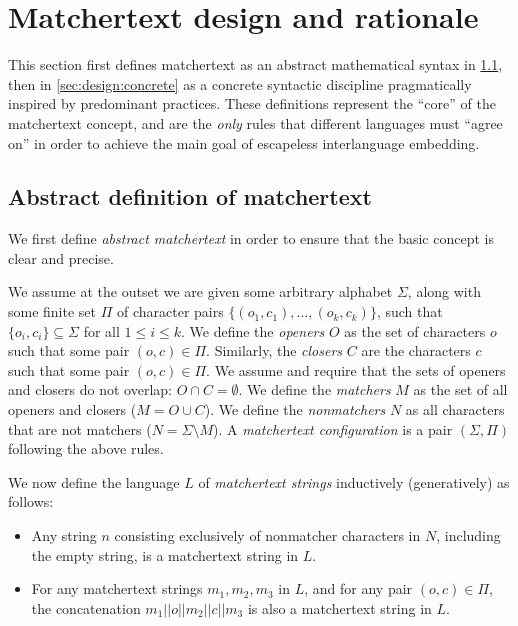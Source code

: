 \section{Matchertext design and rationale}
\label{sec:design}

This section first defines matchertext 
as an abstract mathematical syntax in \cref{sec:design:abstract},
then in \cref{sec:design:concrete}
as a concrete syntactic discipline
pragmatically inspired by predominant practices.
These definitions represent the ``core'' of the matchertext concept,
and are the \emph{only} rules
that different languages must ``agree on''
in order to achieve the main goal of escapeless interlanguage embedding.

\subsection{Abstract definition of matchertext}
\label{sec:design:abstract}

We first define \emph{abstract matchertext}
in order to ensure that the basic concept is clear and precise.

We assume at the outset we are given some arbitrary alphabet $\Sigma$,
along with some finite set $\Pi$ of character pairs 
$\{(o_1,c_1),\dots,(o_k,c_k)\}$,
such that $\{o_i, c_i\} \subseteq \Sigma$ for all $1 \le i \le k$.
We define the \emph{openers} $O$ as the set of characters $o$
such that some pair $(o, c) \in \Pi$.
Similarly, the \emph{closers} $C$ are the characters $c$
such that some pair $(o, c) \in \Pi$.
We assume and require that the sets of openers and closers do not overlap:
\ie $O \cap C = \emptyset$.
We define the \emph{matchers} $M$ as the set of all openers and closers
(\ie $M = O \cup C$).
We define the \emph{nonmatchers} $N$ as
all characters that are not matchers
(\ie $N = \Sigma \setminus M$).
A \emph{matchertext configuration}
is a pair $(\Sigma, \Pi)$ following the above rules.

We now define the language $L$ of \emph{matchertext strings}
inductively (\ie generatively) as follows:
\begin{itemize}
\item	Any string $n$ consisting exclusively of nonmatcher characters in $N$,
	including the empty string,
	is a matchertext string in $L$.
\item	For any matchertext strings $m_1,m_2,m_3$ in $L$,
	and for any pair $(o,c) \in \Pi$,
	the concatenation $m_1||o||m_2||c||m_3$
	is also a matchertext string in $L$.
\end{itemize}


